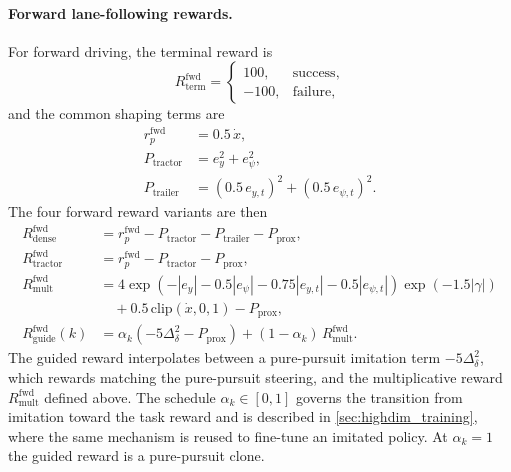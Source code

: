 \paragraph{Forward lane-following rewards.}
For forward driving, the terminal reward is
\begin{equation}
R_{\mathrm{term}}^{\mathrm{fwd}} =
\begin{cases}
100, & \text{success}, \\
-100, & \text{failure},
\end{cases}
\end{equation}
and the common shaping terms are
\begin{align}
r_p^{\mathrm{fwd}} &= 0.5\,\dot{x}, \\
P_{\mathrm{tractor}} &= e_y^2 + e_\psi^2, \\
P_{\mathrm{trailer}} &= (0.5\,e_{y,t})^2 + (0.5\,e_{\psi,t})^2.
\end{align}
The four forward reward variants are then
\begin{align}
R_{\mathrm{dense}}^{\mathrm{fwd}} &= r_p^{\mathrm{fwd}} - P_{\mathrm{tractor}} - P_{\mathrm{trailer}} - P_{\mathrm{prox}},
\\
R_{\mathrm{tractor}}^{\mathrm{fwd}} &= r_p^{\mathrm{fwd}} - P_{\mathrm{tractor}} - P_{\mathrm{prox}},
\\
R_{\mathrm{mult}}^{\mathrm{fwd}} &= 4\exp\!\left(-|e_y|-0.5|e_\psi|-0.75|e_{y,t}|-0.5|e_{\psi,t}|\right)\exp\!\left(-1.5|\gamma|\right) \nonumber\\
&\quad + 0.5\,\mathrm{clip}(\dot{x}, 0, 1) - P_{\mathrm{prox}},
\\
R_{\mathrm{guide}}^{\mathrm{fwd}}(k) &= \alpha_k
\left(-5\Delta_\delta^2 - P_{\mathrm{prox}}\right)
+ (1-\alpha_k)\,R_{\mathrm{mult}}^{\mathrm{fwd}}.
\end{align}
The guided reward interpolates between a pure-pursuit imitation term $-5\Delta_\delta^2$,
which rewards matching the pure-pursuit steering, and the multiplicative reward
$R_{\mathrm{mult}}^{\mathrm{fwd}}$ defined above. The schedule $\alpha_k \in [0,1]$ governs
the transition from imitation toward the task reward and is described in
\cref{sec:highdim_training}, where the same mechanism is reused to fine-tune an imitated
policy. At $\alpha_k = 1$ the guided reward is a pure-pursuit clone.

